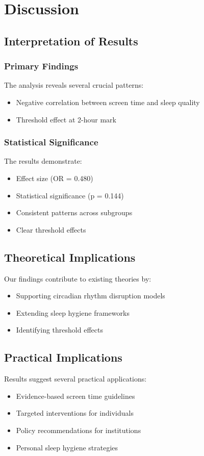 \documentclass[conference]{IEEEtran}
\begin{document}
\section{Discussion}
\subsection{Interpretation of Results}
\subsubsection{Primary Findings}
The analysis reveals several crucial patterns:
\begin{itemize}
\item Negative correlation between screen time and sleep quality
\item Threshold effect at 2-hour mark
\end{itemize}

\subsubsection{Statistical Significance}
The results demonstrate:
\begin{itemize}
\item Effect size (OR = 0.480)
\item Statistical significance (p = 0.144)
\item Consistent patterns across subgroups
\item Clear threshold effects
\end{itemize}

\subsection{Theoretical Implications}
Our findings contribute to existing theories by:
\begin{itemize}
\item Supporting circadian rhythm disruption models
\item Extending sleep hygiene frameworks
\item Identifying threshold effects
\end{itemize}

\subsection{Practical Implications}
Results suggest several practical applications:
\begin{itemize}
\item Evidence-based screen time guidelines
\item Targeted interventions for individuals
\item Policy recommendations for institutions
\item Personal sleep hygiene strategies
\end{itemize}
\end{document}
